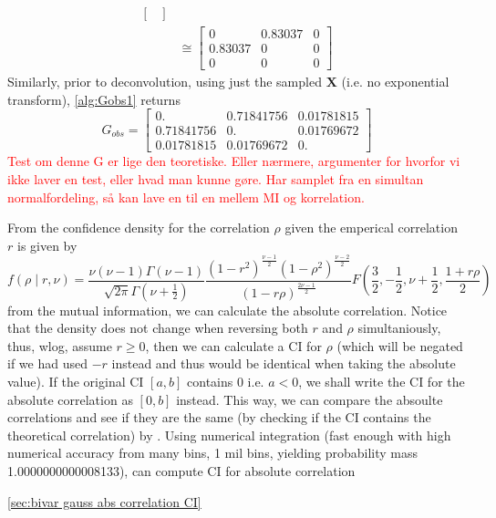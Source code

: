 \documentclass[../Thesis.tex]{subfiles}
\begin{document}
\begin{example}
\begin{align*}
\begin{bmatrix}
        \end{bmatrix} \\
                & \cong
        \begin{bmatrix}
            0       & 0.83037 & 0 \\
            0.83037 & 0       & 0 \\
            0       & 0       & 0
        \end{bmatrix}
    \end{align*}
    Similarly, prior to deconvolution, using just the sampled $\boldsymbol X$ (i.e. no exponential transform), \autoref{alg:Gobs1} returns
    $$G_{obs} =
        \begin{bmatrix}
            0.         & 0.71841756 & 0.01781815 \\
            0.71841756 & 0.         & 0.01769672 \\
            0.01781815 & 0.01769672 & 0.
        \end{bmatrix}
    $$
    \textcolor{red}{Test om denne G er lige den teoretiske. Eller nærmere, argumenter for hvorfor vi ikke laver en test, eller hvad man kunne gøre. Har samplet fra en simultan normalfordeling, så kan lave en til en mellem MI og korrelation. }

    From the confidence density for the correlation $\rho$ given the emperical correlation $r$ is given by
    $$f\left(\rho \mid r,\nu\right) = \frac{\nu (\nu-1) \Gamma(\nu-1)}{\sqrt{2\pi} \Gamma(\nu + \frac{1}{2})} \frac{\left(1-r^2\right)^{\frac{\nu-1}{2}} \left(1-\rho^2\right)^{\frac{\nu-2}{2}} }{\left(1-r\rho\right)^{\frac{2\nu-1}{2}}} F\left(\frac{3}{2}, -\frac{1}{2}, \nu+\frac{1}{2}, \frac{1+r\rho}{2}\right)$$
    from the mutual information, we can calculate the absolute correlation. Notice that the density does not change when reversing both $r$ and $\rho$ simultaniously, thus, wlog, assume $r\geq 0$, then we can calculate a CI for $\rho$ (which will be negated if we had used $-r$ instead and thus would be identical when taking the absolute value). If the original CI $[a,b]$ contains $0$ i.e. $a<0$, we shall write the CI for the absolute correlation as $[0,b]$ instead. This way, we can compare the absoulte correlations and see if they are the same (by checking if the CI contains the theoretical correlation) by \cite{Confidence-in-Correlation}. Using numerical integration (fast enough with high numerical accuracy from many bins, 1 mil bins, yielding probability mass 1.0000000000008133), can compute CI for absolute correlation

    \autoref{sec:bivar gauss abs correlation CI}



\end{example}
\end{document}
